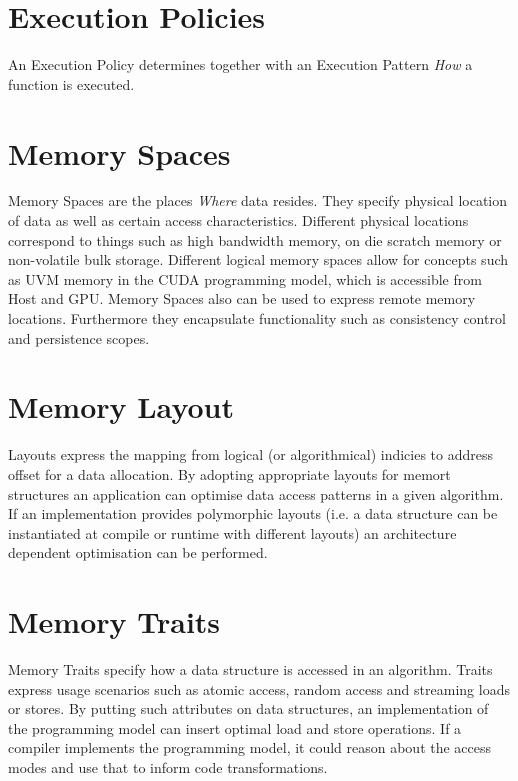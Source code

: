 \section{Execution Policies}

An Execution Policy determines together with an Execution Pattern {\it How} a function is executed.

\section{Memory Spaces}

Memory Spaces are the places {\it Where} data resides.
They specify physical location of data as well as certain access characteristics. 
Different physical locations correspond to things such as high bandwidth memory, on die scratch memory or non-volatile bulk storage.
Different logical memory spaces allow for concepts such as UVM memory in the CUDA programming model, which is accessible from Host and GPU. 
Memory Spaces also can be used to express remote memory locations.
Furthermore they encapsulate functionality such as consistency control and persistence scopes.

\section{Memory Layout}

Layouts express the mapping from logical (or algorithmical) indicies to address offset for a data allocation. 
By adopting appropriate layouts for memort structures an application can optimise data access patterns in a given algorithm.
If an implementation provides polymorphic layouts (i.e. a data structure can be instantiated at compile or runtime with different layouts) an architecture dependent optimisation can be performed.

\section{Memory Traits}

Memory Traits specify how a data structure is accessed in an algorithm. 
Traits express usage scenarios such as atomic access, random access and streaming loads or stores.
By putting such attributes on data structures, an implementation of the programming model can insert optimal load and store operations.
If a compiler implements the programming model, it could reason about the access modes and use that to inform code transformations.   

